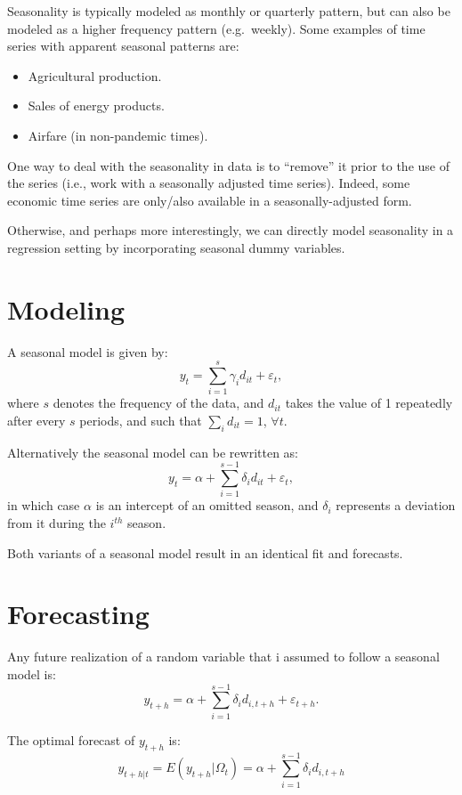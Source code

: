 \documentclass[
  oneside]{book}
\providecommand{\tightlist}{%
  \setlength{\itemsep}{0pt}\setlength{\parskip}{0pt}}
\begin{document}
Seasonality is typically modeled as monthly or quarterly pattern, but can also be modeled as a higher frequency pattern (e.g.~weekly). Some examples of time series with apparent seasonal patterns are:

\begin{itemize}
\tightlist
\item
  Agricultural production.
\item
  Sales of energy products.
\item
  Airfare (in non-pandemic times).
\end{itemize}

One way to deal with the seasonality in data is to ``remove'' it prior to the use of the series (i.e., work with a seasonally adjusted time series). Indeed, some economic time series are only/also available in a seasonally-adjusted form.

Otherwise, and perhaps more interestingly, we can directly model seasonality in a regression setting by incorporating seasonal dummy variables.

\hypertarget{modeling-1}{%
\section{Modeling}\label{modeling-1}}

A seasonal model is given by: \[y_t = \sum_{i=1}^{s}\gamma_i d_{it} + \varepsilon_t,\]
where \(s\) denotes the frequency of the data, and \(d_{it}\) takes the value of 1 repeatedly after every \(s\) periods, and such that \(\sum_{i} d_{it} = 1\), \(\forall t\).

Alternatively the seasonal model can be rewritten as: \[y_t = \alpha + \sum_{i=1}^{s-1}\delta_i d_{it} + \varepsilon_t,\] in which case \(\alpha\) is an intercept of an omitted season, and \(\delta_i\) represents a deviation from it during the \(i^{th}\) season.

Both variants of a seasonal model result in an identical fit and forecasts.

\hypertarget{forecasting-1}{%
\section{Forecasting}\label{forecasting-1}}

Any future realization of a random variable that i assumed to follow a seasonal model is: \[y_{t+h} = \alpha + \sum_{i=1}^{s-1}\delta_i d_{i,t+h} + \varepsilon_{t+h}.\]

The optimal forecast of \(y_{t+h}\) is: \[y_{t+h|t} = E(y_{t+h}|\Omega_t) = \alpha + \sum_{i=1}^{s-1}\delta_i d_{i,t+h}\]
\end{document}
